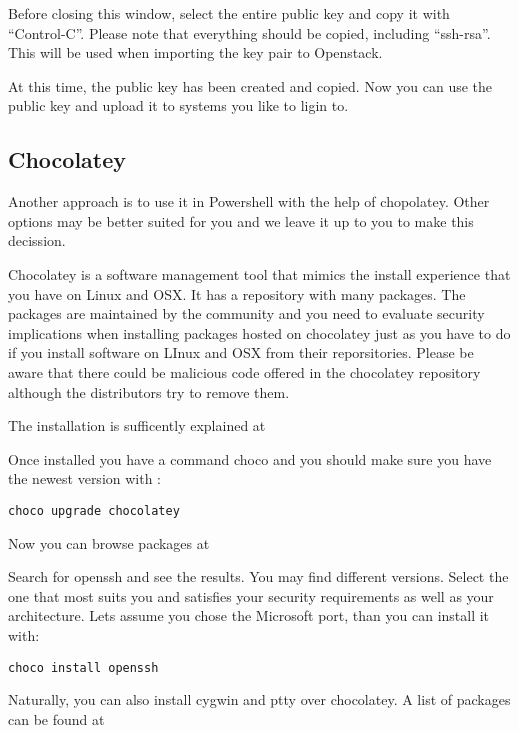 Before closing this window, select the entire public key and copy it
with ``Control-C''. Please note that everything should be copied,
including ``ssh-rsa''. This will be used when importing the key pair to
Openstack.

At this time, the public key has been created and copied. Now you can
use the public key and upload it to systems you like to ligin to.


\subsection{Chocolatey}

Another approach is to use it in Powershell with the help of
chopolatey. Other options may be better suited for you and we leave it
up to you to make this decission. 

Chocolatey is a software management tool that mimics the install
experience that you have on Linux and OSX. It has a repository with
many packages. The packages are maintained by the community and you
need to evaluate security implications when installing packages hosted
on chocolatey just as you have to do if you install software on LInux
and OSX from their reporsitories.  Please be aware that there could be
malicious code offered in the chocolatey repository although the
distributors try to remove them.

The installation is sufficently explained at


Once installed you have a command choco and you should make sure you
have the newest version with :

\begin{verbatim}
choco upgrade chocolatey
\end{verbatim}

Now you can browse packages at


Search for openssh and see the results. You may find different versions.
Select the one that most suits you and satisfies your security
requirements as well as your architecture. Lets assume you chose the
Microsoft port, than you can install it with:

\begin{verbatim}
choco install openssh
\end{verbatim}

Naturally, you can also install cygwin and ptty over chocolatey. A
list of packages can be found at 

